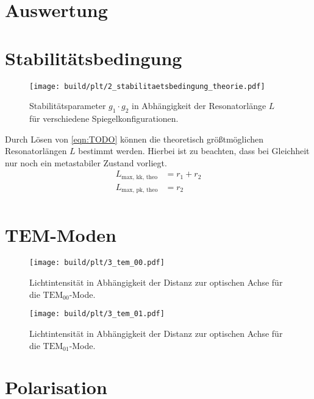 \section{Auswertung}
\label{sec:auswertung}

\section{Stabilitätsbedingung}
\lipsum[1]

\begin{figure}
  \centering
   \texttt{[image: build/plt/2\_stabilitaetsbedingung\_theorie.pdf]}
   \caption{Stabilitätsparameter $g_1 \cdot g_2$ in Abhängigkeit der Resonatorlänge $L$ für verschiedene Spiegelkonfigurationen.}
   \label{fig:plt:stabilitaetsbedingung_theorie}
\end{figure}

Durch Lösen von \autoref{eqn:TODO} können die theoretisch größtmöglichen Resonatorlängen $L$ bestimmt werden.
Hierbei ist zu beachten, dass bei Gleichheit nur noch ein metastabiler Zustand vorliegt.
\begin{align*}
    L_\text{max, kk, theo} &= r_1 + r_2 \\
    L_\text{max, pk, theo} &= r_2 \\
\end{align*}


\section{TEM-Moden}
\lipsum[1]

\begin{figure}
  \centering
   \texttt{[image: build/plt/3\_tem\_00.pdf]}
   \caption{Lichtintensität in Abhängigkeit der Distanz zur optischen Achse für die $\text{TEM}_{00}$-Mode.}
   \label{fig:plt:tem_00}
\end{figure}

\begin{figure}
  \centering
   \texttt{[image: build/plt/3\_tem\_01.pdf]}
   \caption{Lichtintensität in Abhängigkeit der Distanz zur optischen Achse für die $\text{TEM}_{01}$-Mode.}
   \label{fig:plt:tem_01}
\end{figure}


\section{Polarisation}
\lipsum[1]

